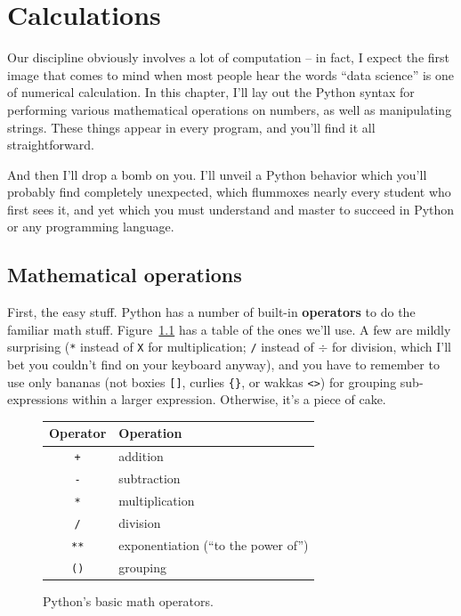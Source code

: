 

\chapter{Calculations}

Our discipline obviously involves a lot of computation -- in fact, I expect the
first image that comes to mind when most people hear the words ``data science''
is one of numerical calculation. In this chapter, I'll lay out the Python
syntax for performing various mathematical operations on numbers, as well as
manipulating strings. These things appear in every program, and you'll find it
all straightforward.

And then I'll drop a bomb on you. I'll unveil a Python behavior which you'll
probably find completely unexpected, which flummoxes nearly every student who
first sees it, and yet which you must understand and master to succeed in
Python or any programming language.

\section{Mathematical operations}


First, the easy stuff. Python has a number of built-in \textbf{operators} to do
the familiar math stuff. Figure~\ref{fig:mathOps} has a table of the ones we'll
use. A few are mildly surprising (\texttt{*} instead of \texttt{X} for
multiplication; \texttt{/} instead of $\div$ for division, which I'll bet you
couldn't find on your keyboard anyway), and you have to remember to use only
bananas (not boxies \texttt{[]}, curlies \texttt{\{\}}, or wakkas \texttt{<>})
for grouping sub-expressions within a larger expression. Otherwise, it's a
piece of cake.

\begin{figure}[ht]
\centering
\begin{tabular}{c | l}
\hline
Operator & Operation \\
\hline
\texttt{+} & addition \\
\texttt{-} & subtraction \\
\texttt{*} & multiplication \\
\texttt{/} & division \\
\texttt{**} & exponentiation (``to the power of'')\\
\texttt{()} & grouping \\
\hline
\end{tabular}
\smallskip
\caption{Python's basic math operators.}
\label{fig:mathOps}
\end{figure}

